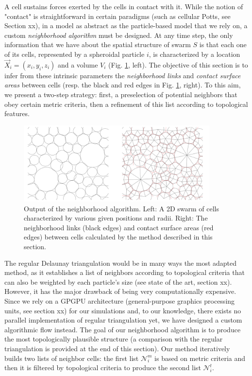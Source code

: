 A cell sustains forces exerted by the cells in contact with it. While the notion of "contact" is straightforward in certain paradigms (such as cellular Potts, see Section xx), in a model as abstract as the particle-based model that we rely on, a custom \textit{neighborhood algorithm} must be designed. At any time step, the only information that we have about the spatial structure of swarm $S$ is that each one of its cells, represented by a spheroidal particle $i$, is characterized by a location $\vec{X}_i = (x_i,y_i,z_i)$ and a volume $V_i$ (Fig. \ref{spatial_neighb_spherecontact_edge_surf_link_figure}, left). The objective of this section is to infer from these intrinsic parameters the \textit{neighborhood links} and \textit{contact surface areas} between cells (resp. the black and red edges in Fig. \ref{spatial_neighb_spherecontact_edge_surf_link_figure}, right). To this aim, we present a two-step strategy: first, a preselection of potential neighbors that obey certain metric criteria, then a refinement of this list according to topological features.
\begin{figure}
\begin{center}
\includegraphics[width=0.9\textwidth]{../../images/MECAGEN/spatial_neighb/spherecontact_edge_surf_link_figure.png}
\end{center}
\caption{Output of the neighborhood algorithm. Left: A 2D swarm of cells characterized by various given positions and radii. Right: The neighborhood links (black edges) and contact surface areas (red edges) between cells calculated by the method described in this section.}
\label{spatial_neighb_spherecontact_edge_surf_link_figure}
\end{figure}

The regular Delaunay triangulation would be in many ways the most adapted method, as it establishes a list of neighbors according to topological criteria that can also be weighted by each particle's size (see state of the art, section xx). However, it has the major drawback of being very computationally expensive. Since we rely on a GPGPU architecture (general-purpose graphics processing units, see section xx) for our simulations and, to our knowledge, there exists no parallel implementation of regular triangulation yet, we have designed a custom algorithmic flow instead. The goal of our neighborhood algorithm is to produce the most topologically plausible structure (a comparison with the regular triangulation is provided at the end of this section). Our method iteratively builds two lists of neighbor cells: the first list $\mathcal{N}^m_i$ is based on metric criteria and then it is filtered by topological criteria to produce the second list $\mathcal{N}^t_i$.

